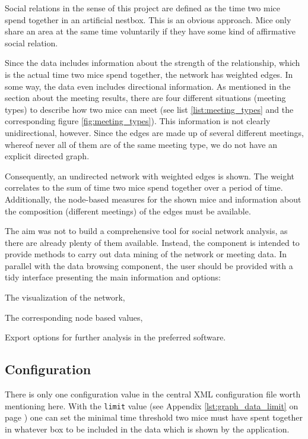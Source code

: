 Social relations in the sense of this project are defined as the time two mice spend together in an artificial nestbox. This is an obvious approach. Mice only share an area at the same time voluntarily if they have some kind of affirmative social relation.

Since the data includes information about the strength of the relationship, which is the actual time two mice spend together, the network has weighted edges. In some way, the data even includes directional information. As mentioned in the section about the meeting results, there are four different situations (meeting types) to describe how two mice can meet (see list \ref{list:meeting_types} and the corresponding figure \ref{fig:meeting_types}). This information is not clearly unidirectional, however. Since the edges are made up of several different meetings, whereof never all of them are of the same meeting type, we do not have an explicit directed graph.

Consequently, an undirected network with weighted edges is shown. The weight correlates to the sum of time two mice spend together over a period of time. Additionally, the node-based measures for the shown mice and information about the composition (different meetings) of the edges must be available.

The aim was not to build a comprehensive tool for social network analysis, as there are already plenty of them available. Instead, the component is intended to provide methods to carry out data mining of the network or meeting data. In parallel with the data browsing component, the user should be provided with a tidy interface presenting the main information and options:

\begin{mylist}
\item The visualization of the network,
\item The corresponding node based values,
\item Export options for further analysis in the preferred software.
\end{mylist}

\subsection{Configuration}
\label{subsec:graph_config}

There is only one configuration value in the central XML configuration file worth mentioning here. With the \lstinline|limit| value (see Appendix \ref{lst:graph_data_limit} on page \pageref{lst:graph_data_limit}) one can set the minimal time threshold two mice must have spent together in whatever box to be included in the data which is shown by the application. 

